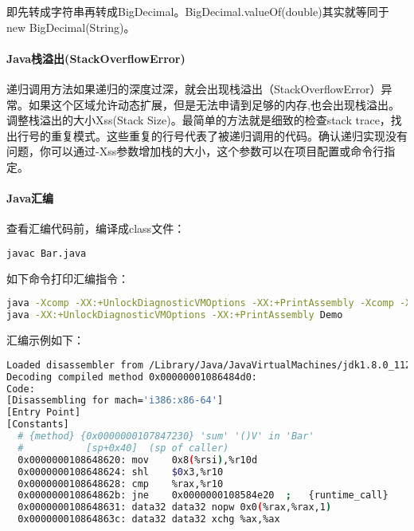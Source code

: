 \documentclass[../../../interview-questions.tex]{subfiles}
\begin{document}
即先转成字符串再转成BigDecimal。BigDecimal.valueOf(double)其实就等同于new BigDecimal(String)。

\paragraph{Java栈溢出(StackOverflowError)}

递归调用方法如果递归的深度过深，就会出现栈溢出（StackOverflowError）异常。如果这个区域允许动态扩展，但是无法申请到足够的内存,也会出现栈溢出。调整栈溢出的大小Xss(Stack Size)。最简单的方法就是细致的检查stack trace，找出行号的重复模式。这些重复的行号代表了被递归调用的代码。确认递归实现没有问题，你可以通过-Xss参数增加栈的大小，这个参数可以在项目配置或命令行指定。

\paragraph{Java汇编}

查看汇编代码前，编译成class文件：

\begin{lstlisting}[language=Bash]
javac Bar.java
\end{lstlisting}

如下命令打印汇编指令：

\begin{lstlisting}[language=Bash]
java -Xcomp -XX:+UnlockDiagnosticVMOptions -XX:+PrintAssembly -Xcomp -XX:CompileCommand=dontinline,Demo.sum -XX:CompileCommand=compileonly,Demo.sum Demo
java -XX:+UnlockDiagnosticVMOptions -XX:+PrintAssembly Demo
\end{lstlisting}

汇编示例如下：
 
\begin{lstlisting}[language=Bash]
Loaded disassembler from /Library/Java/JavaVirtualMachines/jdk1.8.0_112.jdk/Contents/Home/jre/lib/hsdis-amd64.dylib
Decoding compiled method 0x00000001086484d0:
Code:
[Disassembling for mach='i386:x86-64']
[Entry Point]
[Constants]
  # {method} {0x0000000107847230} 'sum' '()V' in 'Bar'
  #           [sp+0x40]  (sp of caller)
  0x0000000108648620: mov    0x8(%rsi),%r10d
  0x0000000108648624: shl    $0x3,%r10
  0x0000000108648628: cmp    %rax,%r10
  0x000000010864862b: jne    0x0000000108584e20  ;   {runtime_call}
  0x0000000108648631: data32 data32 nopw 0x0(%rax,%rax,1)
  0x000000010864863c: data32 data32 xchg %ax,%ax
\end{lstlisting}
\end{document}
